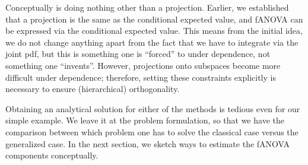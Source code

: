 Conceptually \cite{hooker2007} is doing nothing other than a projection. Earlier, we established that a projection is the same as the conditional expected value, and fANOVA can be expressed via the conditional expected value. This means from the initial idea, we do not change anything apart from the fact that we have to integrate via the joint pdf, but this is something one is ``forced'' to under dependence, not something one ``invents''. However, projections onto subspaces become more difficult under dependence; therefore, setting these constraints explicitly is necessary to ensure (hierarchical) orthogonality.\par

Obtaining an analytical solution for either of the methods is tedious even for our simple example. We leave it at the problem formulation, so that we have the comparison between which problem one has to solve the classical case versus the generalized case. In the next section, we sketch ways to estimate the fANOVA components conceptually.





